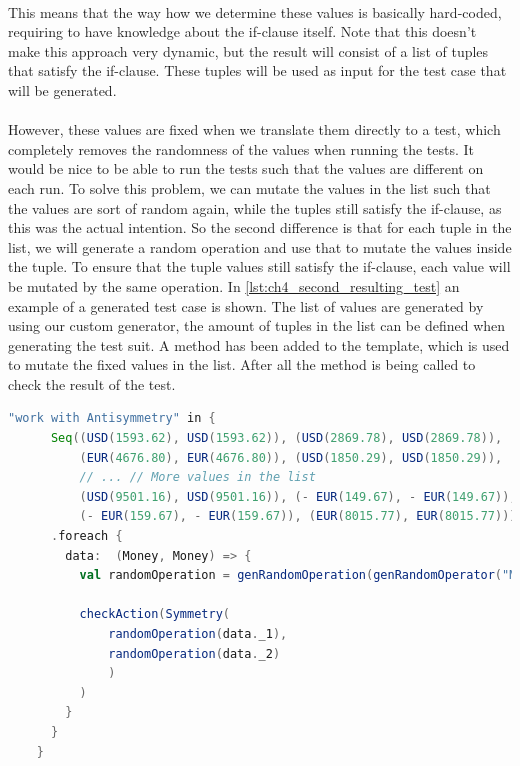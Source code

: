 \\
This means that the way how we determine these values is basically hard-coded, requiring to have knowledge about the if-clause itself. Note that this doesn't make this approach very dynamic, but the result will consist of a list of tuples that satisfy the if-clause. These tuples will be used as input for the test case that will be generated.\\
\\
However, these values are fixed when we translate them directly to a test, which completely removes the randomness of the values when running the tests. It would be nice to be able to run the tests such that the values are different on each run. To solve this problem, we can mutate the values in the list such that the values are sort of random again, while the tuples still satisfy the if-clause, as this was the actual intention. So the second difference is that for each tuple in the list, we will generate a random operation and use that to mutate the values inside the tuple. To ensure that the tuple values still satisfy the if-clause, each value will be mutated by the same operation. In \autoref{lst:ch4_second_resulting_test} an example of a generated test case is shown. The list of values are generated by using our custom generator, the amount of tuples in the list can be defined when generating the test suit. A method  has been added to the template, which is used to mutate the fixed values in the list. After all the  method is being called to check the result of the test.
\\
\begin{sourcecode}[h!]
\begin{lstlisting}[language=Scala]
"work with Antisymmetry" in {
      Seq((USD(1593.62), USD(1593.62)), (USD(2869.78), USD(2869.78)),
          (EUR(4676.80), EUR(4676.80)), (USD(1850.29), USD(1850.29)),
          // ... // More values in the list
          (USD(9501.16), USD(9501.16)), (- EUR(149.67), - EUR(149.67)),
          (- EUR(159.67), - EUR(159.67)), (EUR(8015.77), EUR(8015.77)))
      .foreach {
        data:  (Money, Money) => {
          val randomOperation = genRandomOperation(genRandomOperator("Money", true), generateRandomMoney(data._1.currency), generateRandomInteger(true), generateRandomInteger(false), generateRandomPercentage(true), generateRandomPercentage(false), Random.nextInt(10))

          checkAction(Symmetry(
              randomOperation(data._1),
              randomOperation(data._2)
              )
          )
        }
      }
    }
\end{lstlisting}
\caption{Resulting test case with semi-random values. Omitted some input tuples for readability.}
\label{lst:ch4_second_resulting_test}
\end{sourcecode}
